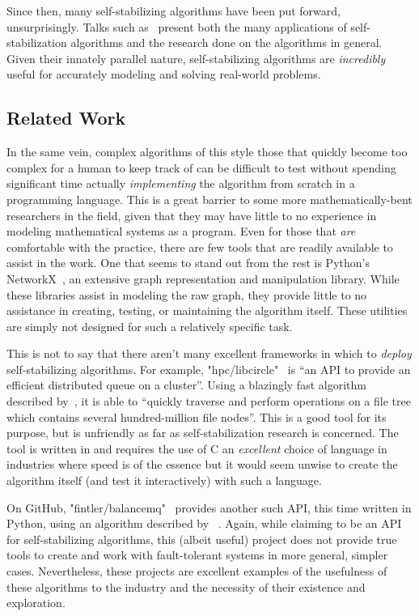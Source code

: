Since then, many self-stabilizing algorithms have been put forward, unsurprisingly.
Talks such as~\autocite{dolev:talk} present both
  the many applications of self-stabilization algorithms and
  the research done on the algorithms in general.
Given their innately parallel nature,
  self-stabilizing algorithms are \emph{incredibly} useful
  for accurately modeling and solving real-world problems.

\subsection{Related Work}
\label{sec:introduction:related-work}
In the same vein, complex algorithms of this style
  \Dash those that quickly become too complex for a human to keep track of \Dash
  can be difficult to test without spending significant time
  actually \emph{implementing} the algorithm from scratch in a programming language.
This is a great barrier to some more mathematically-bent researchers in the field,
  given that they may have little to no experience in modeling mathematical systems as a program.
Even for those that \emph{are} comfortable with the practice,
  there are few tools that are readily available to assist in the work.
One that seems to stand out from the rest is Python's NetworkX~\autocite{hagberg:networkx},
  an extensive graph representation and manipulation library.
While these libraries assist in modeling the raw graph,
  they provide little to no assistance in creating, testing, or maintaining the algorithm itself.
These utilities are simply not designed for such a relatively specific task.

This is not to say that there aren't many excellent frameworks in which
  to \emph{deploy} self-stabilizing algorithms.
For example, "hpc/libcircle"~\autocite{gh:libcircle} is
  \enquote{an API to provide an efficient distributed queue on a cluster}.
Using a blazingly fast algorithm described by~\autocite{lafon:balanceMQ},
  it is able to \enquote{quickly traverse and perform operations on a file tree
    which contains several hundred-million file nodes}.
This is a good tool for its purpose, but is unfriendly as far as self-stabilization research is concerned.
The tool is written in and requires the use of C
  \Dash an \emph{excellent} choice of language in industries where speed is of the essence \Dash
  but it would seem unwise to create the algorithm itself
  (and test it interactively) with such a language.

On GitHub, "fintler/balancemq"~\autocite{gh:balancemq} provides another such API,
  this time written in Python,
  using an algorithm described by \citeauthor{lafon:balanceMQ}~\autocite{lafon:balanceMQ}.
Again, while claiming to be an API for self-stabilizing algorithms,
  this (albeit useful) project does not provide true tools to create and work with
  fault-tolerant systems in more general, simpler cases.
Nevertheless, these projects are excellent examples of the
  usefulness of these algorithms to the industry and
  the necessity of their existence and exploration.

